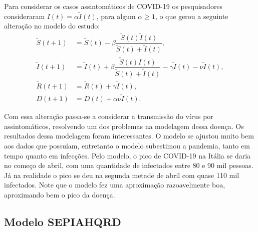 \documentclass{article}
\begin{document}
	Para considerar os casos assintomáticos de COVID-19 os pesquisadores consideraram $I(t) = \alpha\tilde{I}(t)$, para algum $\alpha \geq 1$, o que gerou a seguinte alteração no modelo do estudo:
	\begin{equation*}
		\begin{split}
			\tilde{S}(t + 1) & = \tilde{S}(t) - \beta \dfrac{\tilde{S}(t) \tilde{I}(t)}{\tilde{S}(t) + \tilde{I}(t)}, \\
			\tilde{I}(t + 1) & = \tilde{I}(t) + \beta \dfrac{\tilde{S}(t) I(t)}{\tilde{S}(t) + \tilde{I}(t)} - \gamma \tilde{I}(t) - \nu \tilde{I}(t), \\
			\tilde{R}(t + 1) & = \tilde{R}(t) + \gamma \tilde{I}(t), \\
			D(t + 1) & = D(t) + \alpha \nu \tilde{I}(t).
		\end{split}
	\end{equation*}
	
	Com essa alteração passa-se a considerar a transmissão do vírus por assintomáticos, resolvendo um dos problemas na modelagem dessa doença. Os resultados dessa modelagem foram interessantes. O modelo se ajustou muito bem aos dados que possuíam, entretanto o modelo subestimou a pandemia, tanto em tempo quanto em infecções. Pelo modelo, o pico de COVID-19 na Itália se daria no começo de abril, com uma quantidade de infectados entre 80 e 90 mil pessoas. Já na realidade o pico se deu na segunda metade de abril com quase 110 mil infectados. Note que o modelo fez uma aproximação razoavelmente boa, aproximando bem o pico da doença.
	
	\subsection{Modelo SEPIAHQRD}
	
\end{document}

